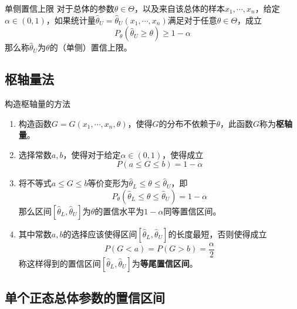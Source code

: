 \documentclass[lang = cn, scheme = chinese, thmcnt = section]{elegantbook}
\begin{document}
\begin{definition}{单侧置信上限}
	对于总体的参数$\theta\in\Theta$，以及来自该总体的样本$x_1,\cdots,x_n$，给定$\alpha\in(0,1)$，如果统计量$\hat{\theta}_{U}=\hat{\theta}_{U}(x_1,\cdots,x_n)$满足对于任意$\theta\in\Theta$，成立
	$$
	P_{\theta}(\hat{\theta}_{U}\ge\theta)\ge 1-\alpha
	$$
	那么称$\hat{\theta}_{U}$为$\theta$的（单侧）置信上限。
\end{definition}

\subsection{枢轴量法}

\begin{theorem}{构造枢轴量的方法}
	\begin{enumerate}
		\item 构造函数$G=G(x_1,\cdots,x_n,\theta)$，使得$G$的分布不依赖于$\theta$，此函数$G$称为{\bf 枢轴量}。
		\item 选择常数$a,b$，使得对于给定$\alpha\in(0,1)$，使得成立
		$$
		P(a\le G\le b)=1-\alpha
		$$
		\item 将不等式$a\le G\le b$等价变形为$\hat{\theta}_{L}\le\theta\le\hat{\theta}_{U}$​，即
		$$
		P_{\theta}(\hat{\theta}_{L}\le\theta\le\hat{\theta}_{U})=1-\alpha
		$$
		那么区间$[\hat{\theta}_{L},\hat{\theta}_{U}]$为$\theta$的置信水平为$1-\alpha$同等置信区间。
		\item 其中常数$a,b$的选择应该使得区间$[\hat{\theta}_{L},\hat{\theta}_{U}]$​的长度最短，否则使得成立
		$$
		P(G<a)=P(G>b)=\frac{\alpha}{2}
		$$
		称这样得到的置信区间$[\hat{\theta}_{L},\hat{\theta}_{U}]$为{\bf 等尾置信区间}。
	\end{enumerate}
\end{theorem}

\subsection{单个正态总体参数的置信区间}

\begin{table}[htbp]
	\centering
	\caption{单个正态总体参数的置信区间}
	\renewcommand{\arraystretch}{2}
\end{table}
\end{document}
